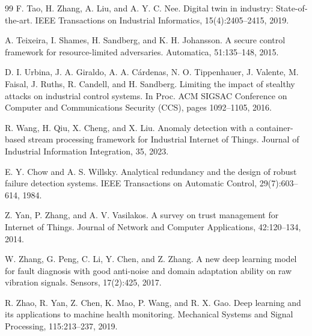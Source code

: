 \begin{thebibliography}{99}
 F. Tao, H. Zhang, A. Liu, and A. Y. C. Nee. Digital twin in industry: State-of-the-art. IEEE Transactions on Industrial Informatics, 15(4):2405--2415, 2019.

 A. Teixeira, I. Shames, H. Sandberg, and K. H. Johansson. A secure control framework for resource-limited adversaries. Automatica, 51:135--148, 2015.

 D. I. Urbina, J. A. Giraldo, A. A. C\'ardenas, N. O. Tippenhauer, J. Valente, M. Faisal, J. Ruths, R. Candell, and H. Sandberg. Limiting the impact of stealthy attacks on industrial control systems. In Proc. ACM SIGSAC Conference on Computer and Communications Security (CCS), pages 1092--1105, 2016.

 R. Wang, H. Qiu, X. Cheng, and X. Liu. Anomaly detection with a container-based stream processing framework for Industrial Internet of Things. Journal of Industrial Information Integration, 35, 2023.

 E. Y. Chow and A. S. Willsky. Analytical redundancy and the design of robust failure detection systems. IEEE Transactions on Automatic Control, 29(7):603--614, 1984.

 Z. Yan, P. Zhang, and A. V. Vasilakos. A survey on trust management for Internet of Things. Journal of Network and Computer Applications, 42:120--134, 2014.

 W. Zhang, G. Peng, C. Li, Y. Chen, and Z. Zhang. A new deep learning model for fault diagnosis with good anti-noise and domain adaptation ability on raw vibration signals. Sensors, 17(2):425, 2017.

 R. Zhao, R. Yan, Z. Chen, K. Mao, P. Wang, and R. X. Gao. Deep learning and its applications to machine health monitoring. Mechanical Systems and Signal Processing, 115:213--237, 2019.

\end{thebibliography}